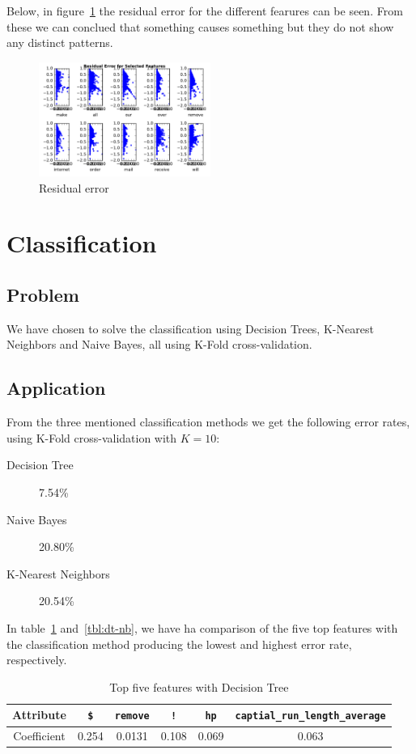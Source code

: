 \documentclass[11pt, paper=a4]{article}
\begin{document}
Below, in figure~\ref{fig:residual-error} the residual error for the different fearures can
be seen. From these we can conclued that something causes something
but they do not show any distinct patterns.

\begin{figure}[h]
  \centering
  \includegraphics[width = 0.5\textwidth]{../../src/img/residual_error.pdf}
  \caption{\label{fig:residual-error} Residual error}
\end{figure}


\clearpage
\section{Classification}

\subsection{Problem}
We have chosen to solve the classification using Decision Trees,
K-Nearest Neighbors and Naive Bayes, all using K-Fold cross-validation.

\subsection{Application}
From the three mentioned classification methods we get the following
error rates, using K-Fold cross-validation with $K=10$:
\begin{description}
  \item[Decision Tree] 7.54\%
  \item[Naive Bayes] 20.80\%
  \item[K-Nearest Neighbors] 20.54\%
\end{description}

In table~\ref{tbl:dt-feat} and~\ref{tbl:dt-nb}, we have ha comparison
of the five top features with the classification method producing the
lowest and highest error rate, respectively.

\begin{table}[h]
  \centering
  \begin{tabular}{c|c|c|c|c|c}
    \hline Attribute & {\tt \$} & {\tt remove} & {\tt !} & {\tt hp} & {\tt captial\_run\_length\_average} \\
    \hline Coefficient & 0.254 & 0.0131 & 0.108 & 0.069 & 0.063 \\
    \hline
  \end{tabular}
  \caption{\label{tbl:dt-feat} Top five features with Decision Tree}
\end{table}
\end{document}
